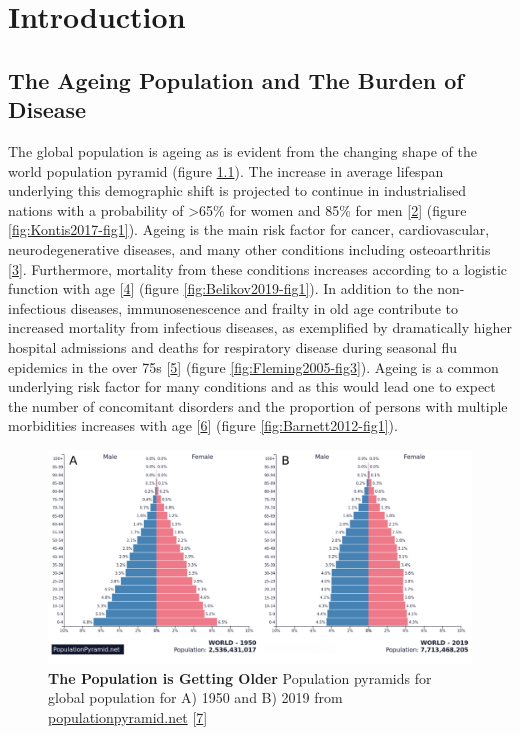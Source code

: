 \documentclass[
]{book}
\begin{document}
\hypertarget{introduction}{%
\chapter{Introduction}\label{introduction}}

\hypertarget{the-ageing-population-and-the-burden-of-disease}{%
\section{The Ageing Population and The Burden of Disease}\label{the-ageing-population-and-the-burden-of-disease}}

The global population is ageing as is evident from the changing shape of the world population pyramid (figure \ref{fig:poppyramid}).
The increase in average lifespan underlying this demographic shift is projected to continue in industrialised nations with a probability of \textgreater65\% for women and 85\% for men {[}\protect\hyperlink{ref-Kontis2017}{2}{]} (figure \ref{fig:Kontis2017-fig1}).
Ageing is the main risk factor for cancer, cardiovascular, neurodegenerative diseases, and many other conditions including osteoarthritis {[}\protect\hyperlink{ref-Niccoli2012}{3}{]}. Furthermore, mortality from these conditions increases according to a logistic function with age {[}\protect\hyperlink{ref-Belikov2019}{4}{]} (figure \ref{fig:Belikov2019-fig1}).
In addition to the non-infectious diseases, immunosenescence and frailty in old age contribute to increased mortality from infectious diseases, as exemplified by dramatically higher hospital admissions and deaths for respiratory disease during seasonal flu epidemics in the over 75s {[}\protect\hyperlink{ref-Fleming2005}{5}{]} (figure \ref{fig:Fleming2005-fig3}).
Ageing is a common underlying risk factor for many conditions and as this would lead one to expect the number of concomitant disorders and the proportion of persons with multiple morbidities increases with age {[}\protect\hyperlink{ref-Barnett2012}{6}{]} (figure \ref{fig:Barnett2012-fig1}).

\begin{figure}

{\centering \includegraphics[width=0.95\linewidth]{figs/population-pryamids-1950-2019} 

}

\caption{\textbf{The Population is Getting Older} Population pyramids for global population for A) 1950 and B) 2019 from \url{populationpyramid.net} {[}\protect\hyperlink{ref-PopulationPyramid2019}{7}{]}}\label{fig:poppyramid}
\end{figure}
\end{document}
